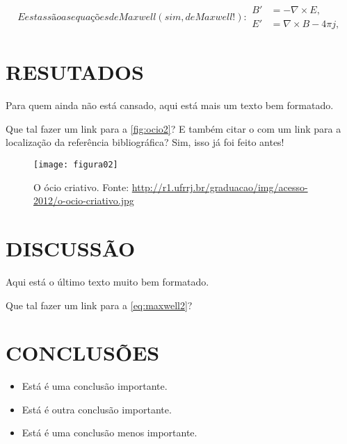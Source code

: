 \begin{subequations}\label{eq:maxwell2}
E estas são as equações de Maxwell (sim, de Maxwell!):
\begin{align}
        B'&=-\nabla \times E,\\
        E'&=\nabla \times B - 4\pi j,
\end{align}
\end{subequations}

\section{RESUTADOS}

Para quem ainda não está cansado, aqui está mais um texto bem formatado. 
\blindtext[1]

Que tal fazer um link para a \autoref{fig:ocio2}? E também citar o 
\citet{Feyerabend1977} com um link para a localização da referência 
bibliográfica? Sim, isso já foi feito antes!

\begin{figure}[!ht]
\centering
\texttt{[image: figura02]}
\caption{\label{fig:ocio2}O ócio criativo. Fonte: 
\url{http://r1.ufrrj.br/graduacao/img/acesso-2012/o-ocio-criativo.jpg}}
\end{figure}

\section{DISCUSSÃO}

Aqui está o último texto muito bem formatado. \blindtext[2]

Que tal fazer um link para a \autoref{eq:maxwell2}?

\section{CONCLUSÕES}

\begin{itemize}
  \item Está é uma conclusão importante.
  \item Está é outra conclusão importante.
  \item Está é uma conclusão menos importante.
\end{itemize}

